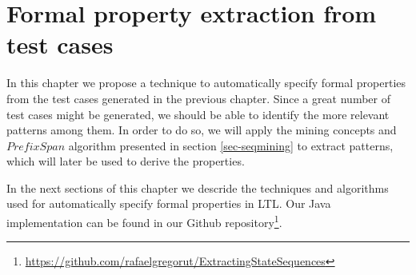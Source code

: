 \chapter{Formal property extraction from test cases}
\label{cap:propextract}

In this chapter we propose a technique to automatically specify formal properties from the test cases generated in the previous chapter. Since a great number of test cases might be generated, we should be able to identify the more relevant patterns among them. In order to do so, we will apply the mining concepts and $PrefixSpan$ algorithm presented in section \ref{sec-seqmining} to extract patterns, which will later be used to derive the properties.

In the next sections of this chapter we descride the techniques and algorithms used for automatically specify formal properties in LTL. Our Java implementation can be found in our Github repository\footnote{\url{https://github.com/rafaelgregorut/ExtractingStateSequences}}.



%


%








